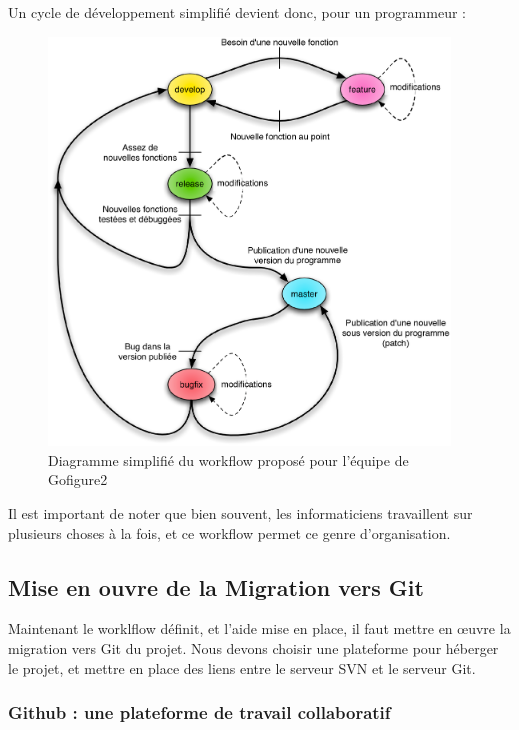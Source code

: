 Un cycle de développement simplifié devient donc, pour un programmeur :
\begin{figure}[h]
\begin{center}
\leavevmode
\includegraphics[width=0.95\textwidth]{pictures/Git_WorkflowSimple}
\end{center}
\caption{Diagramme simplifié du workflow proposé pour l'équipe de Gofigure2}
\label{fig:Workflow Git de Gofigure2}
\end{figure}

Il est important de noter que bien souvent, les informaticiens travaillent sur plusieurs choses à la fois,
et ce workflow permet ce genre d'organisation. 

\subsection{Mise en ouvre de la Migration vers Git}

Maintenant le worklflow définit, et l'aide mise en place, il faut mettre en œuvre la migration vers Git du projet. Nous devons choisir une plateforme pour héberger le projet, et mettre en place des liens entre le serveur SVN et le serveur Git.

\subsubsection{Github : une plateforme de travail collaboratif}

